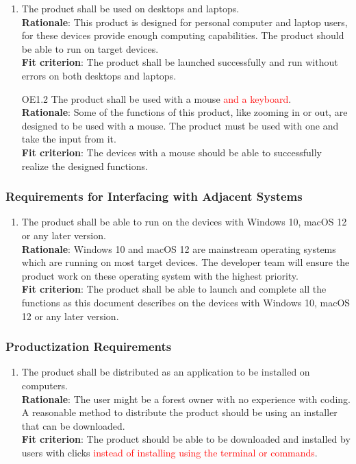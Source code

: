 \documentclass{article}
\begin{document}
\begin{enumerate}[OE1.1]
    \item The product shall be used on desktops and laptops.\\
    \textbf{Rationale}: This product is designed for personal computer and laptop users, for these
     devices provide enough computing capabilities. The product should be able to run on target
      devices.\\
    \textbf{Fit criterion}: The product shall be launched successfully and run without errors on both
     desktops and laptops.\\
   
    \item[OE1.2] The product shall be used with a mouse \textcolor{red}{and a keyboard}.\\
    \textbf{Rationale}: Some of the functions of this product, like zooming in or out, are designed to be used with a mouse. The product must be used with one and take the input from it.\\
    \textbf{Fit criterion}: The devices with a mouse should be able to successfully realize the designed functions.\\
\end{enumerate}

\subsubsection{Requirements for Interfacing with Adjacent Systems}
\begin{enumerate}[OE2.1]
    \item The product shall be able to run on the devices with Windows 10, macOS 12 or any later version.\\
    \textbf{Rationale}: Windows 10 and macOS 12 are mainstream operating systems which are running on most target devices. The developer team will ensure the product work on these operating system with the highest priority.\\
    \textbf{Fit criterion}: The product shall be able to launch and complete all the functions as this document describes on the devices with Windows 10, macOS 12 or any later version.\\
\end{enumerate}
\subsubsection{Productization Requirements}
\begin{enumerate}[OE3.1]
    \item The product shall be distributed as an application to be installed on computers.\\
    \textbf{Rationale}: The user might be a forest owner with no experience with coding. A reasonable method to distribute the product should be using an installer that can be downloaded. \\
    \textbf{Fit criterion}: The product should be able to be downloaded and installed by users with clicks \textcolor{red}{instead of installing using the terminal or commands}. \\
\end{enumerate}
\end{document}

